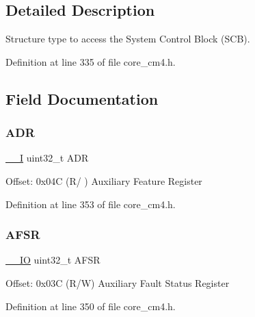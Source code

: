 \subsection{Detailed Description}
Structure type to access the System Control Block (S\+CB). 

Definition at line 335 of file core\+\_\+cm4.\+h.



\subsection{Field Documentation}
\mbox{\label{struct_s_c_b___type_a5c0e2e1c7195d4dc09a5ca077c596318}} 
\subsubsection{\texorpdfstring{A\+DR}{ADR}}
{\footnotesize\ttfamily \hyperlink{group___c_m_s_i_s__core__definitions_gaf63697ed9952cc71e1225efe205f6cd3}{\+\_\+\+\_\+I} uint32\+\_\+t A\+DR}

Offset\+: 0x04C (R/ ) Auxiliary Feature Register 

Definition at line 353 of file core\+\_\+cm4.\+h.

\mbox{\label{struct_s_c_b___type_ab9176079ea223dd8902589da91af63a2}} 
\subsubsection{\texorpdfstring{A\+F\+SR}{AFSR}}
{\footnotesize\ttfamily \hyperlink{group___c_m_s_i_s__core__definitions_gaec43007d9998a0a0e01faede4133d6be}{\+\_\+\+\_\+\+IO} uint32\+\_\+t A\+F\+SR}

Offset\+: 0x03C (R/W) Auxiliary Fault Status Register 

Definition at line 350 of file core\+\_\+cm4.\+h.

\mbox{\label{struct_s_c_b___type_aaec159b48828355cb770049b8b2e8d91}} 

